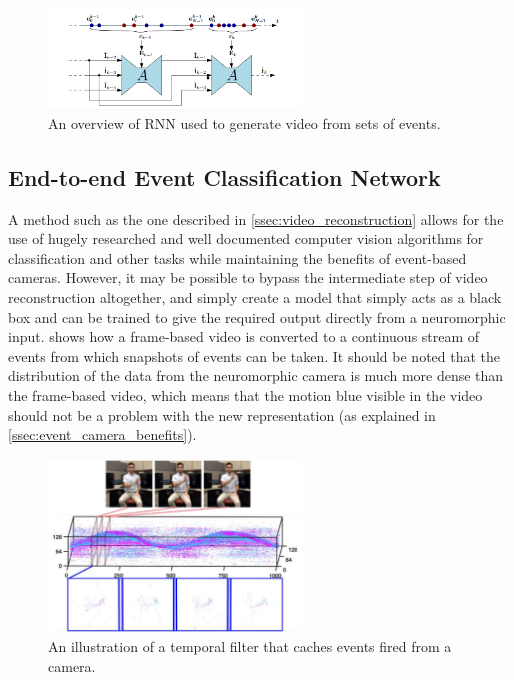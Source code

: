 \begin{figure}[htb]
      \centering
      \includegraphics[width=0.6\textwidth]{background/images/spikes_to_video_rnn.png}
      \caption{An overview of RNN used to generate video from sets of events\cite{spikingToVideo}.}
      \label{fig:spikes_to_video_rnn}
\end{figure}

\subsection{End-to-end Event Classification Network}

A method such as the one described in \cref{ssec:video_reconstruction} allows for the use of hugely researched and well documented computer vision algorithms for classification and other tasks while maintaining the benefits of event-based cameras. However, it may be possible to bypass the intermediate step of video reconstruction altogether, and simply create a model that simply acts as a black box and can be trained to give the required output directly from a neuromorphic input.  shows how a frame-based video is converted to a continuous stream of events from which snapshots of events can be taken. It should be noted that the distribution of the data from the neuromorphic camera is much more dense than the frame-based video, which means that the motion blue visible in the video should not be a problem with the new representation (as explained in \cref{ssec:event_camera_benefits}).

\begin{figure}[htb]
      \centering
      \includegraphics[width=0.6\textwidth]{background/images/temporal_filter.png}
      \caption{An illustration of a temporal filter that caches events fired from a camera\cite{eventBasedGestureRec}.}
      \label{fig:temporal_filter}
\end{figure}

